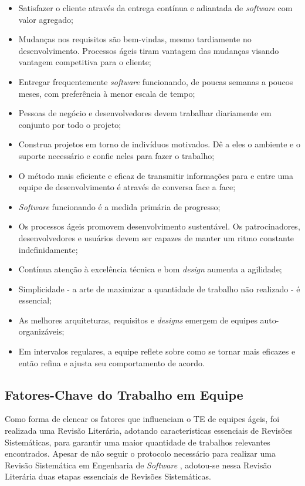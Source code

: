 \begin{itemize}
 \item Satisfazer o cliente através da entrega contínua e adiantada de \textit{software} com valor agregado;
 \item Mudanças nos requisitos são bem-vindas, mesmo tardiamente no desenvolvimento. Processos ágeis tiram vantagem das mudanças visando vantagem
competitiva para o cliente;
 \item Entregar frequentemente \textit{software} funcionando, de poucas semanas a poucos meses, com preferência à menor escala de tempo;
 \item Pessoas de negócio e desenvolvedores devem trabalhar diariamente em conjunto por todo o projeto;
 \item Construa projetos em torno de indivíduos motivados. Dê a eles o ambiente e o suporte necessário e confie neles para fazer o trabalho;
 \item O método mais eficiente e eficaz de transmitir informações para e entre uma equipe de desenvolvimento é através de conversa face a face;
 \item \textit{Software} funcionando é a medida primária de progresso;
 \item Os processos ágeis promovem desenvolvimento sustentável. Os patrocinadores, desenvolvedores e usuários devem ser capazes de manter um ritmo constante indefinidamente;
 \item Contínua atenção à excelência técnica e bom \textit{design} aumenta a agilidade;
 \item Simplicidade - a arte de maximizar a quantidade de trabalho não realizado - é essencial;
 \item As melhores arquiteturas, requisitos e \textit{designs} emergem de equipes auto-organizáveis;
 \item Em intervalos regulares, a equipe reflete sobre como se tornar mais eficazes e então refina e ajusta seu comportamento de acordo.
\end{itemize}

\subsection{Fatores-Chave do Trabalho em Equipe}
\label{fundamentacao:ageis:fatores}

Como forma de elencar os fatores que influenciam o TE de equipes ágeis, foi realizada uma Revisão Literária, adotando características essenciais de Revisões Sistemáticas, para garantir uma maior quantidade de trabalhos relevantes encontrados. Apesar de não seguir o protocolo necessário para realizar uma Revisão Sistemática em Engenharia de \textit{Software} \cite{kitchenham}, adotou-se nessa Revisão Literária duas etapas essenciais de Revisões Sistemáticas.

